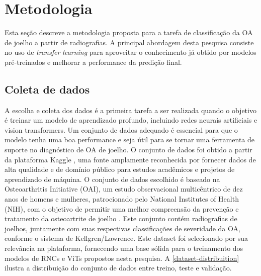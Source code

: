 \chapter{Metodologia}\label{cap:proposta}

Esta seção descreve a metodologia proposta para a tarefa de classificação da OA de joelho a partir de radiografias. A principal abordagem desta pesquisa consiste no uso de \textit{transfer learning} para aproveitar o conhecimento já obtido por modelos pré-treinados e melhorar a performance da predição final.

\section{Coleta de dados}

A escolha e coleta dos dados é a primeira tarefa a ser realizada quando o objetivo é treinar um modelo de aprendizado profundo, incluindo redes neurais artificiais e vision transformers. Um conjunto de dados adequado é essencial para que o modelo tenha uma boa performance e seja útil para se tornar uma ferramenta de suporte no diagnóstico de OA de joelho. O conjunto de dados foi obtido a partir da plataforma Kaggle \cite{dataset-kaggle}, uma fonte amplamente reconhecida por fornecer dados de alta qualidade e de domínio público para estudos acadêmicos e projetos de aprendizado de máquina. O conjunto de dados escolhido é baseado na Osteoarthritis Initiative (OAI), um estudo observacional multicêntrico de dez anos de homens e mulheres, patrocionado pelo National Institutes of Health (NIH), com o objetivo de permitir uma melhor compreensão da prevenção e tratamento da osteoartrite de joelho \cite{oai}. Este conjunto contém radiografias de joelhos, juntamente com suas respectivas classificações de severidade da OA, conforme o sistema de Kellgren/Lawrence. Este dataset foi selecionado por sua relevância na plataforma, fornecendo uma base sólida para o treinamento dos modelos de RNCs e ViTs propostos nesta pesquisa. A \autoref{dataset-distribuition} ilustra a distribuição do conjunto de dados entre treino, teste e validação.

